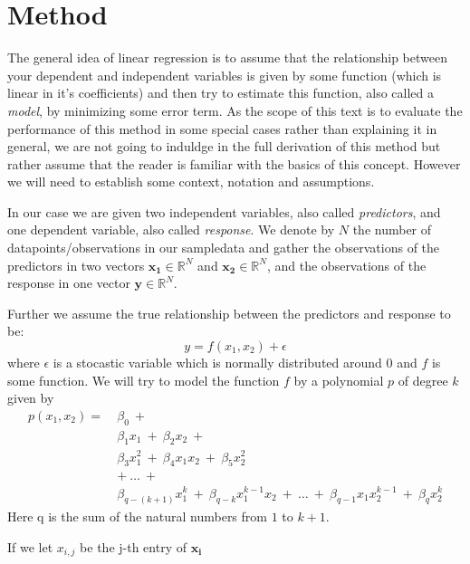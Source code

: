 \documentclass[a4paper,norsk]{article}
\begin{document}
\section{Method}
The general idea of linear regression is to assume that the relationship 
between your dependent and independent variables is given by some function 
(which is linear in it's coefficients)
and then try to estimate this function, also called a \textit{model}, 
by minimizing some error term. As the scope of this text is to evaluate the
performance of this method in some special cases rather than explaining it 
in general, we are not going to induldge in the full derivation 
of this method but rather assume that the reader is familiar with the 
basics of this concept. However we will need to establish some context, 
notation and assumptions.
\par
In our case we are given two independent variables, also called 
\textit{predictors}, 
and one dependent variable, also called 
\textit{response}. We denote by 
$N$ the number of 
datapoints/observations in our sampledata and gather the observations 
of the predictors in two vectors $\bm{x_1} \in \mathbb{R}^N$ and 
$\bm{x_2} \in \mathbb{R}^N$, and the observations of the response in one 
vector $\bm{y} \in \mathbb{R}^N$.
\par
Further we assume the true relationship between the predictors and 
response to be:
\begin{equation}
    y = f(x_1, x_2) + \epsilon
\end{equation}
where $\epsilon$ is a stocastic variable which is normally distributed 
around 0 and $f$ is some function. 
We will try to model the function $f$ by a polynomial $p$ of degree $k$ 
given by 
\begin{equation}
    \begin{split}
        p(x_1, x_2) = \ &\beta_0 \ + \\ 
        & \beta_1 x_1 \ + \ \beta_2 x_2 \ + \\
        & \beta_3 x_1^2 \ + \ \beta_4 x_1 x_2 \ + \ \beta_5 x_2^2 \\
        & + \ \dots \ + \\
        & \beta_{q-(k+1)} x_1^k \ + \ \beta_{q-k} x_1^{k-1} x_2 \ 
        + \ \dots \ + \ \beta_{q-1} x_1 x_2^{k-1} \ + \ \beta_q x_2^k
    \end{split}
\end{equation}
Here q is the sum of the natural numbers from $1$ to $k + 1$.
\par
If we let $x_{i,j}$ be the j-th entry of $\bm{x_i}$ 
\end{document}
